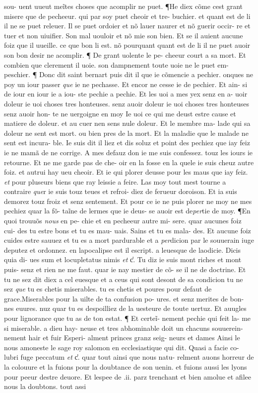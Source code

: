 \documentclass{article}
\begin{document}
\begin{pages}
sou- uent uueut meĩtes choses que acomplir ne puet. ¶He diex cõme cest grant misere que de pecheeur. qui par soy puet cheoir et tre- buchier. et quant est de li il ne se puet releuer. Il se puet ordoier et nõ lauer naurer et nõ guerir occir- re et tuer et non uiuifier. Son mal uouloir et nõ mie son bien. Et se il auient aucune foiz que il uueille. ce que bon li est. nõ pourquant quant est de li il ne puet auoir son bon desir ne acomplir. ¶ De grant uolente le pe- cheeur court a sa mort. Et combien que clerement il uoie. son dampnement toute uoie ne le puet em- peschier. ¶ Donc dit saint bernart puis dit il que ie cõmencie a pechier. onques ne poy un iour passer \textit{que} ie ne pechasse. Et encor ne cesse ie de pechier. Et ain- si de iour en iour ie a iou- ste pechie a pechie. Et les uoi a mes yex senz en a- uoir doleur ie uoi choses tres honteuses. senz auoir doleur ie uoi choses tres honteuses senz auoir hon- te ne uergoigne en moy Ie uoi ce qui me deust estre cause et matiere de doleur. et au cuer nen sens nule doleur. Et le membre ma- lade qui sa doleur ne sent est mort. ou bien pres de la mort. Et la maladie que le malade ne sent est incura- ble. Ie suis dit il liez et dis soluz et point des pechiez que iay feiz ie ne mamã de ne corrige. A mes defauz don ie me suis confessez. touz les iours ie retourne. Et ne me garde pas de che- oir en la fosse en la quele ie suis cheuz autre foiz. et autrui hay ueu cheoir. Et ie qui plorer deusse pour les maus que iay feiz. \textit{et} pour pluseurs biens que ray leissie a feire. Las moy tout mest tourne a contraire \textit{que}r ie suis touz teues et refroi- diez de ferueur doroison. Et ia suis demorez touz froiz et senz sentement. Et pour ce ie ne puis plorer ne moy ne mes pechiez quar la fõ- taĩne de lermes que ie deus- se auoir est de\textit{per}tie de moy. ¶En quoi trouuõs \textit{nous} en pe- chie et en pecheeur autre mi- sere. quar aucunes foiz cui- des tu estre bons et tu es mau- uais. Sains et tu es mala- des. Et aucune foiz cuides estre sauuez et tu es a mort pardurable et a \textit{per}dicion par le souuerain iuge deputez et ordonnez. en lapocalipse est il escript. a leuesque de laodicie. Dicis quia di- ues sum et locupletatus nimis \textit{et} c̾. Tu diz ie suis mont riches et mont puis- senz et rien ne me faut. quar ie nay mestier de cõ- se il ne de doctrine. Et tu ne sez dit diex a cel euesque et a ceus qui sont desont de sa condicion tu ne sez \textit{que} tu es chetis miserables. tu es chetis et poures pour defaut de grace.Miserables pour la uilte de ta confusion po- ures. et senz merites de bon- nes euures. nuz quar tu es despoilliez de la uesteure de toute uertuz. Et auugles pour lignorance que tu as de ton estat. ¶ Et certeĩ- nement pechie qui feit la- me si miserable. a dieu hay- neuse et tres abhominable doit un chacuns souuerein- nement hair et fuir Esperi- alment princes granz seig- neurs et dames Ainsi le nous amoneste le sage roy salomon en ecclesiastique qui dit. Quasi a facie co- lubri fuge peccatum \textit{et} c̾. quar tout ainsi que nous natu- relment auons horreur de la colouure et la fuions pour la doubtance de son uenin. et fuions aussi les lyons pour peeur destre deuore. Et lespee de .ii. parz trenchant et bien amolue et afilee nous la doubtons. tout assi 
\end{pages}
\end{document}
